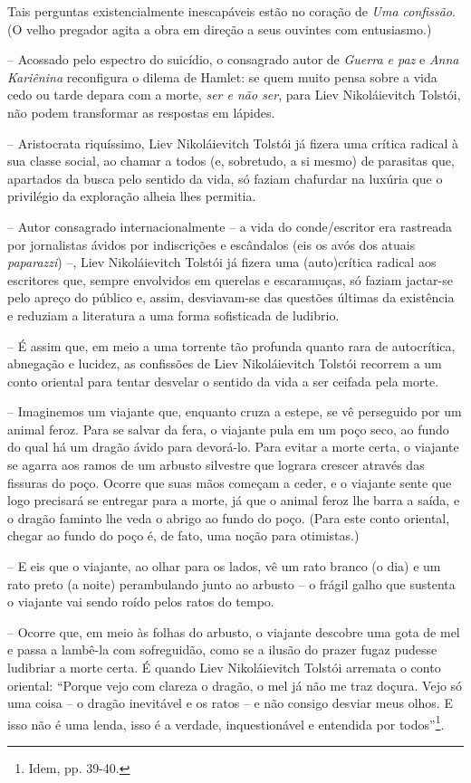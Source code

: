 Tais perguntas existencialmente inescapáveis estão no coração de
\emph{Uma confissão}. (O velho pregador agita a obra em direção a seus
ouvintes com entusiasmo.)

-- Acossado pelo espectro do suicídio, o consagrado autor de
\emph{Guerra e paz} e \emph{Anna Kariênina} reconfigura o dilema de
Hamlet: se quem muito pensa sobre a vida cedo ou tarde depara com a
morte, \emph{ser e não ser}, para Liev Nikoláievitch Tolstói, não podem
transformar as respostas em lápides.

-- Aristocrata riquíssimo, Liev Nikoláievitch Tolstói já fizera uma
crítica radical à sua classe social, ao chamar a todos (e, sobretudo, a
si mesmo) de parasitas que, apartados da busca pelo sentido da vida, só
faziam chafurdar na luxúria que o privilégio da exploração alheia lhes
permitia.

-- Autor consagrado internacionalmente -- a vida do conde/escritor era
rastreada por jornalistas ávidos por indiscrições e escândalos (eis os
avós dos atuais \emph{paparazzi}) --, Liev Nikoláievitch Tolstói já
fizera uma (auto)crítica radical aos escritores que, sempre envolvidos
em querelas e escaramuças, só faziam jactar-se pelo apreço do público e,
assim, desviavam-se das questões últimas da existência e reduziam a
literatura a uma forma sofisticada de ludibrio.

-- É assim que, em meio a uma torrente tão profunda quanto rara de
autocrítica, abnegação e lucidez, as confissões de Liev Nikoláievitch
Tolstói recorrem a um conto oriental para tentar desvelar o sentido da
vida a ser ceifada pela morte.

-- Imaginemos um viajante que, enquanto cruza a estepe, se vê perseguido
por um animal feroz. Para se salvar da fera, o viajante pula em um poço
seco, ao fundo do qual há um dragão ávido para devorá-lo. Para evitar a
morte certa, o viajante se agarra aos ramos de um arbusto silvestre que
lograra crescer através das fissuras do poço. Ocorre que suas mãos
começam a ceder, e o viajante sente que logo precisará se entregar para
a morte, já que o animal feroz lhe barra a saída, e o dragão faminto lhe
veda o abrigo ao fundo do poço. (Para este conto oriental, chegar ao
fundo do poço é, de fato, uma noção para otimistas.)

-- E eis que o viajante, ao olhar para os lados, vê um rato branco (o
dia) e um rato preto (a noite) perambulando junto ao arbusto -- o frágil
galho que sustenta o viajante vai sendo roído pelos ratos do tempo.

-- Ocorre que, em meio às folhas do arbusto, o viajante descobre uma
gota de mel e passa a lambê-la com sofreguidão, como se a ilusão do
prazer fugaz pudesse ludibriar a morte certa. É quando Liev
Nikoláievitch Tolstói arremata o conto oriental: ``Porque vejo com
clareza o dragão, o mel já não me traz doçura. Vejo só uma coisa -- o
dragão inevitável e os ratos -- e não consigo desviar meus olhos. E isso
não é uma lenda, isso é a verdade, inquestionável e entendida por
todos''\footnote{Idem, pp. 39-40.}.

